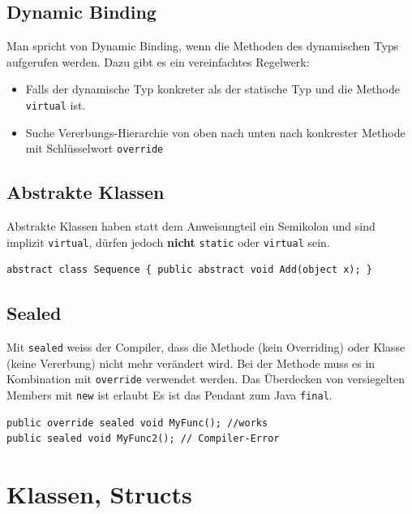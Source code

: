 \documentclass[
a4paper,
oneside,
10pt,
fleqn,
headsepline,
toc=listofnumbered, 
bibliography=totocnumbered]{scrartcl}
\let\stdsection\section
\renewcommand\section{\clearpage\stdsection}
\begin{document}
\subsection{Dynamic Binding}
Man spricht von Dynamic Binding, wenn die Methoden des dynamischen Typs aufgerufen werden. Dazu gibt es ein vereinfachtes Regelwerk:
\begin{itemize}
	\item Falls der dynamische Typ konkreter als der statische Typ und die Methode \lstinline|virtual| ist.
	\item Suche Vererbungs-Hierarchie von oben nach unten nach konkrester Methode mit Schlüsselwort \lstinline|override|
\end{itemize}

\subsection{Abstrakte Klassen}
Abstrakte Klassen haben statt dem Anweisungteil ein Semikolon und sind implizit \lstinline|virtual|, dürfen jedoch \textbf{nicht} \lstinline|static| oder \lstinline|virtual| sein.
\begin{lstlisting}
abstract class Sequence { public abstract void Add(object x); }
\end{lstlisting}

\subsection{Sealed}
Mit \lstinline|sealed| weiss der Compiler, dass die Methode (kein Overriding) oder Klasse (keine Vererbung) nicht mehr verändert wird.
Bei der Methode muss es in Kombination mit \lstinline|override| verwendet werden.
Das Überdecken von versiegelten Members mit \lstinline|new| ist erlaubt
Es ist das Pendant zum Java \lstinline|final|.
\begin{lstlisting} 
public override sealed void MyFunc(); //works
public sealed void MyFunc2(); // Compiler-Error
\end{lstlisting}

\section{Klassen, Structs}
\end{document}
